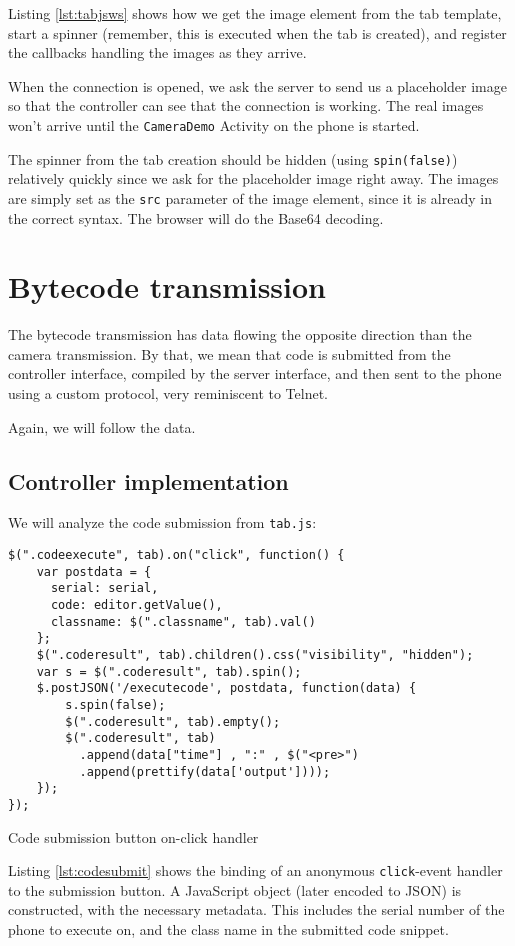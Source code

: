 \documentclass[a4paper]{report}
\newcommand{\classname}[1]{\texttt{#1}}
\newcommand{\filename}[1]{\texttt{#1}}
\begin{document}
{Listing \ref{lst:tabjsws} shows how we get the image element from the tab template, start a spinner (remember, this is executed when the tab is created), and register the callbacks handling the images as they arrive.

When the connection is opened, we ask the server to send us a placeholder image so that the controller can see that the connection is working. The real images won't arrive until the \classname{CameraDemo} Activity on the phone is started.

The spinner from the tab creation should be hidden (using \texttt{spin(false)}) relatively quickly since we ask for the placeholder image right away. The images are simply set as the \texttt{src} parameter of the image element, since it is already in the correct syntax. The browser will do the Base64 decoding.

\chapter{Bytecode transmission}
\label{ch:bytecode}

The bytecode transmission has data flowing the opposite direction than the camera transmission. By that, we mean that code is submitted from the controller interface, compiled by the server interface, and then sent to the phone using a custom protocol, very reminiscent to Telnet.

Again, we will follow the data.

\section{Controller implementation}
\label{sec:controller-codesubmit}
We will analyze the code submission from \filename{tab.js}:
\begin{listing}[H]
\begin{verbatim}
$(".codeexecute", tab).on("click", function() {
    var postdata = {
      serial: serial,
      code: editor.getValue(),
      classname: $(".classname", tab).val()
    };
    $(".coderesult", tab).children().css("visibility", "hidden");
    var s = $(".coderesult", tab).spin();
    $.postJSON('/executecode', postdata, function(data) {
        s.spin(false);
        $(".coderesult", tab).empty();
        $(".coderesult", tab)
          .append(data["time"] , ":" , $("<pre>")
          .append(prettify(data['output'])));
    });
});
\end{verbatim}
\caption{Code submission button on-click handler}
\label{lst:codesubmit}
\end{listing}
Listing \ref{lst:codesubmit} shows the binding of an anonymous \texttt{click}-event handler to the submission button. A JavaScript object (later encoded to JSON) is constructed, with the necessary metadata. This includes the serial number of the phone to execute on, and the class name in the submitted code snippet.

}
\end{document}

